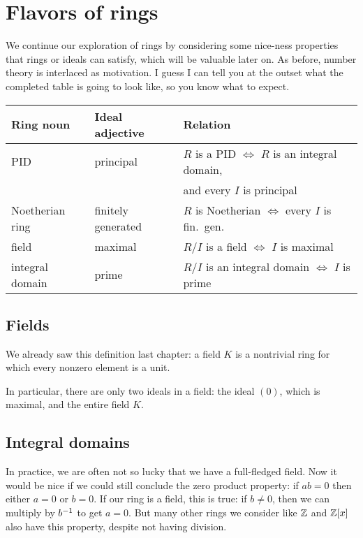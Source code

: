 \chapter{Flavors of rings}
\label{ch:flavors_rings}
We continue our exploration of rings by considering
some nice-ness properties that rings or ideals can satisfy,
which will be valuable later on.
As before, number theory is interlaced as motivation.
I guess I can tell you at the outset what the completed table
is going to look like, so you know what to expect.

\begin{center}
	\begin{tabular}[h]{lll}
		Ring noun & Ideal adjective & Relation \\ \hline
		PID & principal &
			$R$ is a PID $\iff$ $R$ is an integral domain, \\
			&& \qquad and every $I$ is principal \\
		Noetherian ring & finitely generated &
			$R$ is Noetherian $\iff$ every $I$ is fin.\ gen. \\
		field & maximal & $R/I$ is a field $\iff$ $I$ is maximal \\
		integral domain & prime & $R/I$ is an integral domain
			$\iff$ $I$ is prime \\
	\end{tabular}
\end{center}

\section{Fields}

We already saw this definition last chapter:
a field $K$ is a nontrivial ring for which every nonzero element is a unit.

In particular, there are only two ideals in a field:
the ideal $(0)$, which is maximal, and the entire field $K$.

\section{Integral domains}

In practice, we are often not so lucky that we have a full-fledged field.
Now it would be nice if we could still conclude the zero product property:
if $ab = 0$ then either $a = 0$ or $b = 0$.
If our ring is a field, this is true: if $b \neq 0$,
then we can multiply by $b^{-1}$ to get $a = 0$.
But many other rings we consider like $\mathbb Z$ and $\mathbb Z[x]$ also have this property,
despite not having division.

